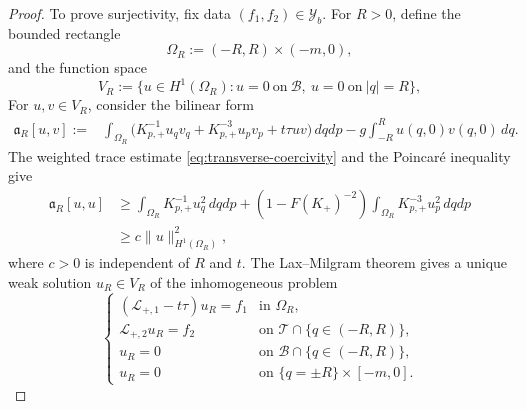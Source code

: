 \documentclass[12pt,letterpaper]{amsart}
\numberwithin{equation}{section}
\begin{document}
\begin{proof}
 {To prove surjectivity, fix data $(f_1,f_2)\in\mathscr Y_b$. For $R>0$, define the bounded rectangle}
 \begin{equation*}
 	{\Omega_R:=(-R,R)\times(-m,0)},
 \end{equation*}
 and the function space
 \begin{equation*}
 	V_R:=\{u\in H^1(\Omega_R):u=0\mathrm{~on~}\mathcal B,~u=0\mathrm{~on~}|q|=R\},
 \end{equation*}
 {For $u,v\in V_R$, consider the bilinear form}
 \begin{equation*}
 	 \begin{split}
 		\mathfrak a_{R}[u,v]
 		:= {}&\int_{\Omega_R}
		\bigl(K_{p,+}^{-1}u_qv_q+K_{p,+}^{-3}u_pv_p+t\tau uv\bigr)\,d qd p-g\int_{-R}^{R}u(q,0)v(q,0)\,d q .
 	\end{split}
 \end{equation*}
 {The weighted trace estimate \eqref{eq:transverse-coercivity} and the Poincar\'e inequality give}
 \begin{equation*}
 	\begin{split}
 		\mathfrak a_{R}[u,u]
 		&\ge \int_{\Omega_R}K_{p,+}^{-1}u_q^2\,d qd p
 		+(1-F(K_+)^{-2})
 		\int_{\Omega_R}K_{p,+}^{-3}u_p^2\,d qd p\\
 		&\ge c\|u\|_{H^1(\Omega_R)}^2,
 	\end{split}
 \end{equation*}
 where $c>0$ is independent of $R$ and $t$. {The Lax--Milgram theorem gives a unique weak solution $u_R\in V_R$ of the inhomogeneous problem}
 \begin{equation*}
 	\begin{cases}
		({\mathscr L_{+,1}}-t\tau)u_R=f_1&\text{in }\Omega_R,\\
		{\mathscr L_{+,2}}u_R=f_2&\text{on }\mathcal T\cap\{q\in(-R,R)\},\\
		u_R=0&\text{on }\mathcal B\cap\{q\in(-R,R)\},\\
		{u_R=0}&{\text{on }\{q=\pm R\}\times[-m,0].}
	\end{cases}
 \end{equation*}


\end{proof}
\end{document}
